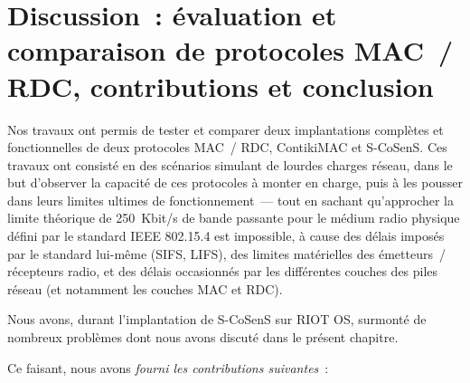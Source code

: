
\section[Discussion~: évaluation et comparaison de protocoles MAC~/ RDC,
         contributions et conclusion]
        {Discussion~: évaluation et comparaison de protocoles MAC~/ RDC,
         contributions et conclusion%
         }
\label{SecDiscussContribConcluProtocolesMAC}

Nos travaux ont permis de tester et comparer deux implantations complètes
et fonctionnelles de deux protocoles MAC~/ RDC, ContikiMAC et S-CoSenS.
Ces travaux ont consisté en des scénarios simulant de lourdes charges
réseau, dans le but d'observer la capacité de ces protocoles à monter
en charge, puis à les pousser dans leurs limites ultimes de fonctionnement~---
tout en sachant qu'approcher la limite théorique de 250~Kbit/s de bande
passante pour le médium radio physique défini par le standard IEEE
802.15.4 est impossible, à cause des délais imposés par le standard
lui-même (SIFS, LIFS), des limites matérielles des émetteurs~/ récepteurs
radio, et des délais occasionnés par les différentes couches des piles
réseau (et notamment les couches MAC et RDC).

Nous avons, durant l'implantation de S-CoSenS sur RIOT OS, surmonté
de nombreux problèmes dont nous avons discuté dans le présent chapitre.

Ce faisant, nous avons \emph{fourni les contributions suivantes}~:

